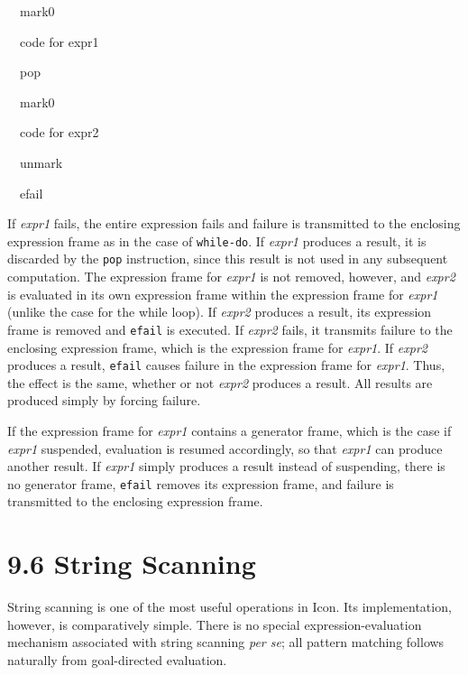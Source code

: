 {\ttfamily\mdseries
\ \ mark0}

{\ttfamily\mdseries
\ \ code for expr1}

{\ttfamily\mdseries
\ \ pop}

{\ttfamily\mdseries
\ \ mark0}

{\ttfamily\mdseries
\ \ code for expr2}

{\ttfamily\mdseries
\ \ unmark}

{\ttfamily\mdseries
\ \ efail}


If \textit{expr1} fails, the entire expression fails and failure is
transmitted to the enclosing expression frame as in the case of
\texttt{while-do}. If \textit{expr1} produces a result, it is
discarded by the \texttt{pop} instruction, since this result is not
used in any subsequent computation. The expression frame for
\textit{expr1} is not removed, however, and \textit{expr2} is
evaluated in its own expression frame within the expression frame for
\textit{expr1} (unlike the case for the while loop). If \textit{expr2}
produces a result, its expression frame is removed and \texttt{efail}
is executed. If \textit{expr2} fails, it transmits failure to the
enclosing expression frame, which is the expression frame for
\textit{expr1}. If \textit{expr2} produces a result, \texttt{efail}
causes failure in the expression frame for \textit{expr1}. Thus, the
effect is the same, whether or not \textit{expr2} produces a
result. All results are produced simply by forcing failure.

If the expression frame for \textit{expr1} contains a generator frame,
which is the case if \textit{expr1} suspended, evaluation is resumed
accordingly, so that \textit{expr1} can produce another result. If
\textit{expr1} simply produces a result instead of suspending, there
is no generator frame, \texttt{efail} removes its expression frame,
and failure is transmitted to the enclosing expression frame.


\section[9.6 String Scanning]{9.6 String Scanning}

String scanning is one of the most useful operations in Icon. Its
implementation, however, is comparatively simple.  There is no special
expression-evaluation mechanism associated with string scanning
\textit{per se}; all {\textquotedbl}pattern matching{\textquotedbl}
follows naturally from goal-directed evaluation.

